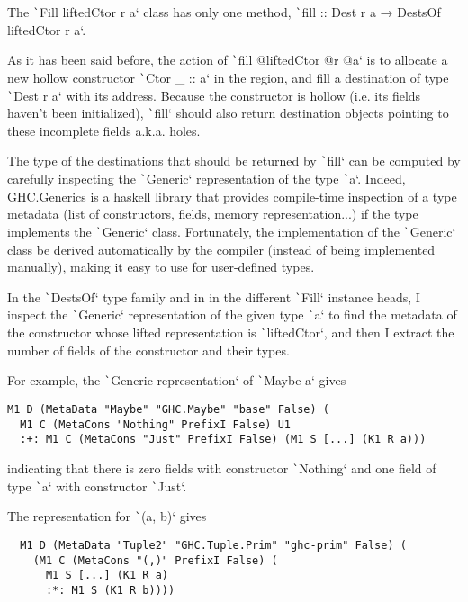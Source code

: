\documentclass[english]{jflart}
\begin{document}
The \texttt`Fill liftedCtor r a` class has only one method, \texttt`fill :: Dest r a → DestsOf liftedCtor r a`.

As it has been said before, the action of \texttt`fill @liftedCtor @r @a` is to allocate a new hollow constructor \texttt`Ctor _ :: a` in the region, and fill a destination of type \texttt`Dest r a` with its address. Because the constructor is hollow (i.e. its fields haven't been initialized), \texttt`fill` should also return destination objects pointing to these incomplete fields a.k.a. holes.

The type of the destinations that should be returned by \texttt`fill` can be computed by carefully inspecting the \texttt`Generic` representation of the type \texttt`a`. Indeed, GHC.Generics is a haskell library that provides compile-time inspection of a type metadata (list of constructors, fields, memory representation...) if the type implements the \texttt`Generic` class. Fortunately, the implementation of the \texttt`Generic` class be derived automatically by the compiler (instead of being implemented manually), making it easy to use for user-defined types.

In the \texttt`DestsOf` type family and in in the different \texttt`Fill` instance heads, I inspect the \texttt`Generic` representation of the given type \texttt`a` to find the metadata of the constructor whose lifted representation is \texttt`liftedCtor`, and then I extract the number of fields of the constructor and their types.

For example, the \texttt`Generic representation` of \texttt`Maybe a` gives

{\small
\begin{verbatim}
M1 D (MetaData "Maybe" "GHC.Maybe" "base" False) (
  M1 C (MetaCons "Nothing" PrefixI False) U1
  :+: M1 C (MetaCons "Just" PrefixI False) (M1 S [...] (K1 R a)))
\end{verbatim}
}

indicating that there is zero fields with constructor \texttt`Nothing` and one field of type \texttt`a` with constructor \texttt`Just`. 


The representation for \texttt`(a, b)` gives

{\small
\begin{verbatim}
  M1 D (MetaData "Tuple2" "GHC.Tuple.Prim" "ghc-prim" False) (
    (M1 C (MetaCons "(,)" PrefixI False) (
      M1 S [...] (K1 R a)
      :*: M1 S (K1 R b))))
\end{verbatim}
}
\end{document}
